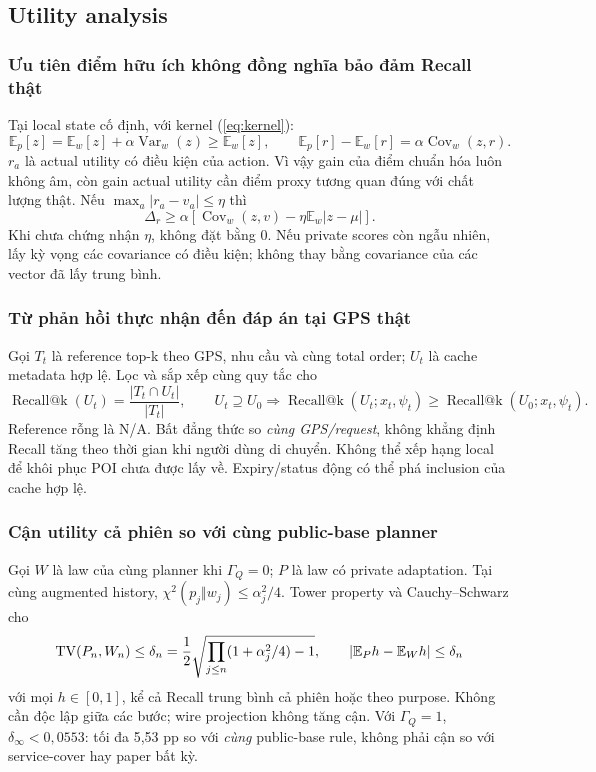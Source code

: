 \clearpage
\subsection{Utility analysis}\label{sec:utilityproof}
\subsubsection{Ưu tiên điểm hữu ích không đồng nghĩa bảo đảm Recall thật}
Tại local state cố định, với kernel (\ref{eq:kernel}):
\begin{equation}
\mathbb E_p[z]=\mathbb E_w[z]+\alpha\operatorname{Var}_w(z)\ge\mathbb E_w[z],\qquad
\mathbb E_p[r]-\mathbb E_w[r]=\alpha\operatorname{Cov}_w(z,r).
\label{eq:gain}
\end{equation}
$r_a$ là actual utility có điều kiện của action. Vì vậy gain của điểm chuẩn hóa luôn không âm, còn gain
actual utility cần điểm proxy tương quan đúng với chất lượng thật. Nếu $\max_a|r_a-v_a|\le\eta$ thì
\[
\Delta_r\ge\alpha\left[\operatorname{Cov}_w(z,v)-\eta\mathbb E_w|z-\mu|\right].
\]
Khi chưa chứng nhận $\eta$, không đặt bằng 0. Nếu private scores còn ngẫu nhiên, lấy kỳ vọng các
covariance có điều kiện; không thay bằng covariance của các vector đã lấy trung bình.

\subsubsection{Từ phản hồi thực nhận đến đáp án tại GPS thật}
Gọi $T_t$ là reference top-k theo GPS, nhu cầu và cùng total order; $U_t$ là cache metadata hợp lệ.
Lọc và sắp xếp cùng quy tắc cho
\begin{equation}
\operatorname{Recall@k}(U_t)=\frac{|T_t\cap U_t|}{|T_t|},\qquad
U_t\supseteq U_0\Longrightarrow\operatorname{Recall@k}(U_t;x_t,\psi_t)
\ge\operatorname{Recall@k}(U_0;x_t,\psi_t).
\label{eq:cache}
\end{equation}
Reference rỗng là N/A. Bất đẳng thức so \emph{cùng GPS/request}, không khẳng định Recall tăng theo thời gian
khi người dùng di chuyển. Không thể xếp hạng local để khôi phục POI chưa được lấy về. Expiry/status động
có thể phá inclusion của cache hợp lệ.

\subsubsection{Cận utility cả phiên so với cùng public-base planner}
Gọi $W$ là law của cùng planner khi $\Gamma_Q=0$; $P$ là law có private adaptation.
Tại cùng augmented history, $\chi^2(p_j\Vert w_j)\le\alpha_j^2/4$. Tower property và Cauchy--Schwarz cho
\begin{equation}
\operatorname{TV}(P_n,W_n)\le\delta_n=\frac12\sqrt{\prod_{j\le n}(1+\alpha_j^2/4)-1},\qquad
|\mathbb E_Ph-\mathbb E_Wh|\le\delta_n
\label{eq:utilitypath}
\end{equation}
với mọi $h\in[0,1]$, kể cả Recall trung bình cả phiên hoặc theo purpose. Không cần độc lập giữa các bước;
wire projection không tăng cận. Với $\Gamma_Q=1$, $\delta_\infty<0{,}0553$: tối đa 5,53 pp so với \emph{cùng}
public-base rule, không phải cận so với service-cover hay paper bất kỳ.

